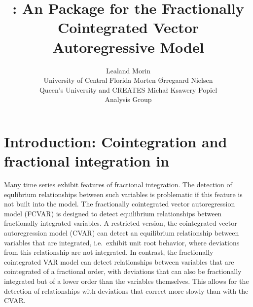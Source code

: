 \documentclass[article]{jss}
\author{Lealand Morin\\University of Central Florida
   \And Morten \O rregaard Nielsen\\Queen's University and CREATES
   \AND Micha\l{} Ksawery Popiel\\Analysis Group}
\title{\pkg{FCVAR}: An \proglang{R} Package for the Fractionally Cointegrated Vector Autoregressive Model}
\begin{document}


\section[Introduction: Cointegration and fractional integration in R]{Introduction: Cointegration and fractional integration in } \label{sec:intro}

% 

Many time series exhibit features of fractional integration. 
The detection of equlibrium relationships between such variables is problematic if this feature is not built into the model. 
% 
The fractionally cointegrated vector autoregression model (FCVAR) is designed to detect equilibrium relationships between fractionally integrated variables. 
A restricted version, the cointegrated vector autoregression model (CVAR) can detect an equilibrium relationship between variables that are integrated, i.e.~exhibit unit root behavior, where deviations from this relationship are not integrated. 
In contrast, the fractionally cointegrated VAR model can detect relationships between variables that are cointegrated of a fractional order, with deviations that can also be fractionally integrated but of a lower order than the variables themselves. 
This allows for the detection of relationships with deviations that correct more slowly than with the CVAR. 
% 
\end{document}
